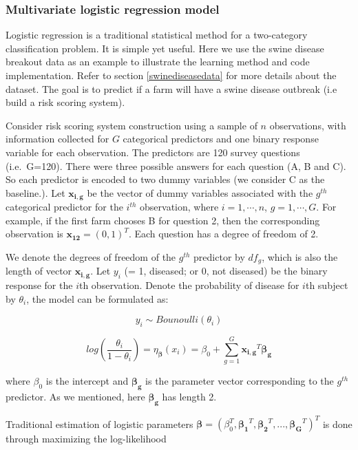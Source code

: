 \documentclass[
  12pt,
]{krantz}
\begin{document}
\hypertarget{multivariate-logistic-regression-model}{%
\subsubsection{Multivariate logistic regression model}\label{multivariate-logistic-regression-model}}

Logistic regression is a traditional statistical method for a two-category classification problem. It is simple yet useful. Here we use the swine disease breakout data as an example to illustrate the learning method and code implementation. Refer to section \ref{swinediseasedata} for more details about the dataset. The goal is to predict if a farm will have a swine disease outbreak (i.e build a risk scoring system).

Consider risk scoring system construction using a sample of \(n\) observations, with information collected for \(G\) categorical predictors and one binary response variable for each observation. The predictors are 120 survey questions (i.e.~G=120). There were three possible answers for each question (A, B and C). So each predictor is encoded to two dummy variables (we consider C as the baseline.). Let \(\mathbf{x_{i,g}}\) be the vector of dummy variables associated with the \(g^{th}\) categorical predictor for the \(i^{th}\) observation, where \(i=1,\cdots,n\), \(g=1,\cdots,G\). For example, if the first farm chooses B for question 2, then the corresponding observation is \(\mathbf{x_{12}}=(0,1)^{T}\). Each question has a degree of freedom of 2.

We denote the degrees of freedom of the \(g^{th}\) predictor by \(df_g\), which is also the length of vector \(\mathbf{x_{i,g}}\). Let \(y_i\) (= 1, diseased; or 0, not diseased) be the binary response for the \(i\)th observation. Denote the probability
of disease for \(i\)th subject by \(\theta_i\), the model can be formulated as:

\[y_{i}\sim Bounoulli(\theta_{i})\]

\[log\left(\frac{\theta_{i}}{1-\theta_{i}}\right)=\eta_{\symbf{\beta}}(x_{i})=\beta_{0}+\sum_{g=1}^{G}\mathbf{x_{i,g}}^{T}\symbf{\beta_{g}}\]

where \(\beta_{0}\) is the intercept and \(\symbf{\beta_{g}}\) is the parameter vector corresponding to the \(g^{th}\) predictor. As we mentioned, here \(\symbf{\beta_{g}}\) has length 2.

Traditional estimation of logistic
parameters \(\symbf{\beta}=(\beta_{0}^{T},\symbf{\beta_{1}}^{T},\symbf{\beta_{2}}^{T},...,\symbf{\beta_{G}}^{T})^{T}\) is done through maximizing the log-likelihood
\end{document}
